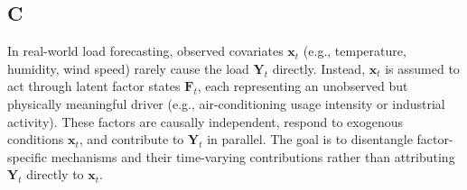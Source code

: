 ﻿\documentclass[journal]{IEEEtran}
\begin{document}









\subsection{C}
In real-world load forecasting, observed covariates $\mathbf{x}_t$ (e.g., temperature, humidity, wind speed) rarely cause the load $\mathbf{Y}_t$ directly. Instead, $\mathbf{x}_t$ is assumed to act through latent factor states $\mathbf{F}_t$, each representing an unobserved but physically meaningful driver (e.g., air-conditioning usage intensity or industrial activity). These factors are causally independent, respond to exogenous conditions $\mathbf{x}_t$, and contribute to $\mathbf{Y}_t$ in parallel. The goal is to disentangle factor-specific mechanisms and their time-varying contributions rather than attributing $\mathbf{Y}_t$ directly to $\mathbf{x}_t$. 
\end{document}
